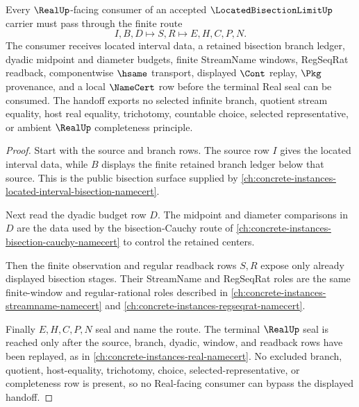 \begin{theorem}
\label{thm:located-bisection-limit-real-seal-handoff}
Every $\RealUp$-facing consumer of an accepted $\LocatedBisectionLimitUp$ carrier must pass through the finite route
$$
I,B,D \longmapsto S,R \longmapsto E,H,C,P,N .
$$
The consumer receives located interval data, a retained bisection branch ledger, dyadic midpoint and diameter budgets, finite StreamName windows, RegSeqRat readback, componentwise $\hsame$ transport, displayed $\Cont$ replay, $\Pkg$ provenance, and a local $\NameCert$ row before the terminal Real seal can be consumed. The handoff exports no selected infinite branch, quotient stream equality, host real equality, trichotomy, countable choice, selected representative, or ambient $\RealUp$ completeness principle.
\end{theorem}
\begin{proof}
Start with the source and branch rows. The source row $I$ gives the located interval data, while $B$ displays the finite retained branch ledger below that source. This is the public bisection surface supplied by \autoref{ch:concrete-instances-located-interval-bisection-namecert}.

Next read the dyadic budget row $D$. The midpoint and diameter comparisons in $D$ are the data used by the bisection-Cauchy route of \autoref{ch:concrete-instances-bisection-cauchy-namecert} to control the retained centers.

Then the finite observation and regular readback rows $S,R$ expose only already displayed bisection stages. Their StreamName and RegSeqRat roles are the same finite-window and regular-rational roles described in \autoref{ch:concrete-instances-streamname-namecert} and \autoref{ch:concrete-instances-regseqrat-namecert}.

Finally $E,H,C,P,N$ seal and name the route. The terminal $\RealUp$ seal is reached only after the source, branch, dyadic, window, and readback rows have been replayed, as in \autoref{ch:concrete-instances-real-namecert}. No excluded branch, quotient, host-equality, trichotomy, choice, selected-representative, or completeness row is present, so no Real-facing consumer can bypass the displayed handoff.
\end{proof}


